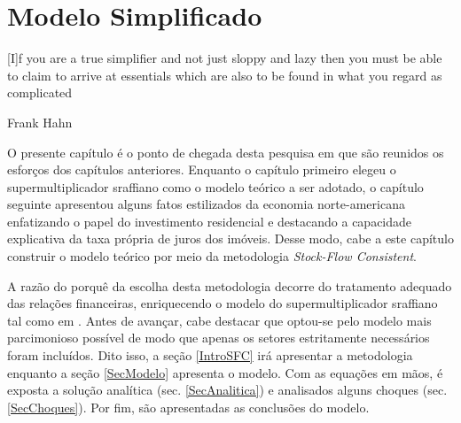 
\chapter{Modelo Simplificado}\label{CapModelo}

\epigraph{[I]f you are a true simplifier and not just
sloppy and lazy then you must be able to claim to arrive at essentials which are also to be
found in what you regard as complicated}{Frank Hahn}

O presente capítulo é o ponto de chegada desta pesquisa em que são reunidos os esforços dos capítulos anteriores. Enquanto o capítulo primeiro elegeu o supermultiplicador sraffiano como o modelo teórico a ser adotado, o capítulo seguinte apresentou alguns fatos estilizados da economia norte-americana enfatizando o papel do investimento residencial e destacando a capacidade explicativa da taxa própria de juros dos imóveis. Desse modo, cabe a este capítulo construir o modelo teórico por meio da metodologia \textit{Stock-Flow Consistent}. 

A razão do porquê da escolha desta metodologia decorre do tratamento adequado das relações financeiras, enriquecendo o modelo do supermultiplicador sraffiano tal como em \textcite{brochier_supermultiplier_2018}. Antes de avançar, cabe destacar que optou-se pelo modelo mais parcimonioso possível de modo que apenas os setores estritamente necessários foram incluídos.
Dito isso, a seção \ref{IntroSFC} irá apresentar a metodologia enquanto a seção \ref{SecModelo} apresenta o modelo. Com as equações em mãos, é exposta a solução analítica (sec. \ref{SecAnalitica}) e analisados alguns choques (sec. \ref{SecChoques}).
Por fim, são apresentadas as conclusões do modelo.






